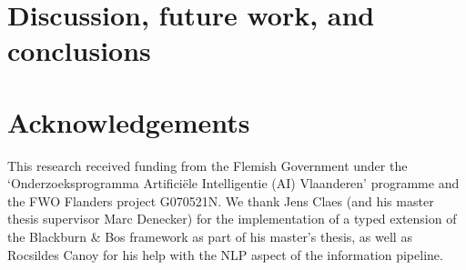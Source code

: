 \documentclass[3p]{elsarticle}
\newcommand\comment[1]{\marginpar{\tiny #1}}
\renewcommand\comment[1]{#1}
\newcommand{\bart}[1]{{\comment{\color{blue}\textsc{BB:}#1}}}
\newcommand{\tias}[1]{{\comment{\color{blue}\textsc{TG:}#1}}}
\newcommand{\emilio}[1]{{\comment{\color{red}\textsc{EG:}#1}}}
\newcommand{\todo}[1]{{\comment{\color{red}\textsc{TODO:}#1}}}
\begin{document}
\section{Discussion, future work, and conclusions}\label{sec:conclusion}










\section*{Acknowledgements}
This research received funding from the Flemish Government under the `Onderzoeksprogramma Artifici\"ele Intelligentie (AI) Vlaanderen' programme and the
FWO Flanders project G070521N.
We thank Jens Claes (and his master thesis supervisor Marc Denecker) for the implementation of a typed extension of the Blackburn \& Bos framework as part of his master's thesis, as well as Rocsildes Canoy for his help with the NLP aspect of the information pipeline. %



\end{document}
